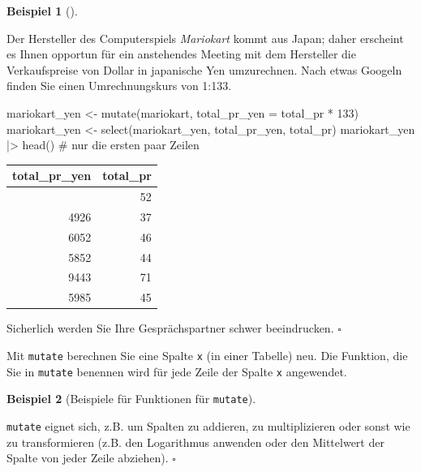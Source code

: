 \documentclass[
  letterpaper,
  oneside,
  open=any]{scrbook}
\newenvironment{Shaded}{\begin{snugshade}}{\end{snugshade}}
\newcommand{\AttributeTok}[1]{\textcolor[rgb]{0.40,0.45,0.13}{#1}}
\newcommand{\CommentTok}[1]{\textcolor[rgb]{0.37,0.37,0.37}{#1}}
\newcommand{\DecValTok}[1]{\textcolor[rgb]{0.68,0.00,0.00}{#1}}
\newcommand{\FunctionTok}[1]{\textcolor[rgb]{0.28,0.35,0.67}{#1}}
\newcommand{\NormalTok}[1]{\textcolor[rgb]{0.00,0.23,0.31}{#1}}
\newcommand{\OtherTok}[1]{\textcolor[rgb]{0.00,0.23,0.31}{#1}}
\newcommand{\SpecialCharTok}[1]{\textcolor[rgb]{0.37,0.37,0.37}{#1}}
\theoremstyle{definition}
\theoremstyle{definition}
\newtheorem{example}{Beispiel}[chapter]
\theoremstyle{definition}
\theoremstyle{remark}
\begin{document}
\begin{example}[]\protect\hypertarget{exm-mutate}{}\label{exm-mutate}

Der Hersteller des Computerspiels \emph{Mariokart} kommt aus Japan;
daher erscheint es Ihnen opportun für ein anstehendes Meeting mit dem
Hersteller die Verkaufspreise von Dollar in japanische Yen umzurechnen.
Nach etwas Googeln finden Sie einen Umrechnungskurs von 1:133.

\begin{Shaded}
\begin{Highlighting}[]
\NormalTok{mariokart\_yen }\OtherTok{\textless{}{-}} 
  \FunctionTok{mutate}\NormalTok{(mariokart, }\AttributeTok{total\_pr\_yen =}\NormalTok{ total\_pr }\SpecialCharTok{*} \DecValTok{133}\NormalTok{)}
\NormalTok{mariokart\_yen }\OtherTok{\textless{}{-}} \FunctionTok{select}\NormalTok{(mariokart\_yen, total\_pr\_yen, total\_pr)}
\NormalTok{mariokart\_yen }\SpecialCharTok{|\textgreater{}} \FunctionTok{head}\NormalTok{()  }\CommentTok{\# nur die ersten paar Zeilen}
\end{Highlighting}
\end{Shaded}

\begin{longtable}[]{@{}rr@{}}
\toprule\noalign{}
total\_pr\_yen & total\_pr \\
\midrule\noalign{}
\endhead
\bottomrule\noalign{}
\endlastfoot
6856 & 52 \\
4926 & 37 \\
6052 & 46 \\
5852 & 44 \\
9443 & 71 \\
5985 & 45 \\
\end{longtable}

Sicherlich werden Sie Ihre Gesprächspartner schwer beeindrucken.
\(\square\)

\end{example}

Mit \texttt{mutate} berechnen Sie eine Spalte \texttt{x} (in einer
Tabelle) neu. Die Funktion, die Sie in \texttt{mutate} benennen wird für
jede Zeile der Spalte \texttt{x} angewendet.

\begin{example}[Beispiele für Funktionen für
\texttt{mutate}]\protect\hypertarget{exm-mutate2}{}\label{exm-mutate2}

\texttt{mutate} eignet sich, z.B. um Spalten zu addieren, zu
multiplizieren oder sonst wie zu transformieren (z.B. den Logarithmus
anwenden oder den Mittelwert der Spalte von jeder Zeile abziehen).
\(\square\)

\end{example}
\end{document}
